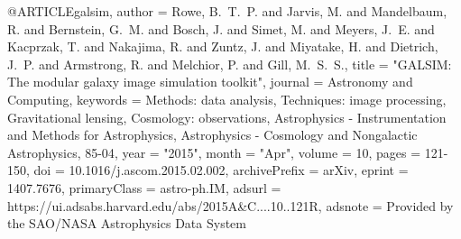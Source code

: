 
@ARTICLE{galsim,
       author = {{Rowe}, B.~T.~P. and {Jarvis}, M. and {Mandelbaum}, R. and
         {Bernstein}, G.~M. and {Bosch}, J. and {Simet}, M. and {Meyers}, J.~E. and
         {Kacprzak}, T. and {Nakajima}, R. and {Zuntz}, J. and {Miyatake}, H. and
         {Dietrich}, J.~P. and {Armstrong}, R. and {Melchior}, P. and
         {Gill}, M.~S.~S.},
        title = "{GALSIM: The modular galaxy image simulation toolkit}",
      journal = {Astronomy and Computing},
     keywords = {Methods: data analysis, Techniques: image processing, Gravitational lensing, Cosmology: observations, Astrophysics - Instrumentation and Methods for Astrophysics, Astrophysics - Cosmology and Nongalactic Astrophysics, 85-04},
         year = "2015",
        month = "Apr",
       volume = {10},
        pages = {121-150},
          doi = {10.1016/j.ascom.2015.02.002},
archivePrefix = {arXiv},
       eprint = {1407.7676},
 primaryClass = {astro-ph.IM},
       adsurl = {https://ui.adsabs.harvard.edu/abs/2015A&C....10..121R},
      adsnote = {Provided by the SAO/NASA Astrophysics Data System}
}
